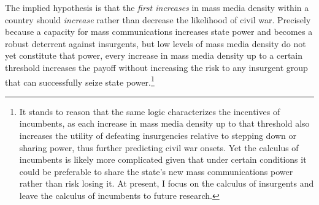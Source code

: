 \documentclass[11pt,article,oneside]{memoir}
\begin{document}
The implied hypothesis is that the \emph{first increases} in mass media
density within a country should \emph{increase} rather than decrease the
likelihood of civil war. Precisely because a capacity for mass
communications increases state power and becomes a robust deterrent
against insurgents, but low levels of mass media density do not yet
constitute that power, every increase in mass media density up to a
certain threshold increases the payoff without increasing the risk to
any insurgent group that can successfully seize state power.\footnote{It
  stands to reason that the same logic characterizes the incentives of
  incumbents, as each increase in mass media density up to that
  threshold also increases the utility of defeating insurgencies
  relative to stepping down or sharing power, thus further predicting
  civil war onsets. Yet the calculus of incumbents is likely more
  complicated given that under certain conditions it could be preferable
  to share the state's new mass communications power rather than risk
  losing it. At present, I focus on the calculus of insurgents and leave
  the calculus of incumbents to future research.}
\end{document}
